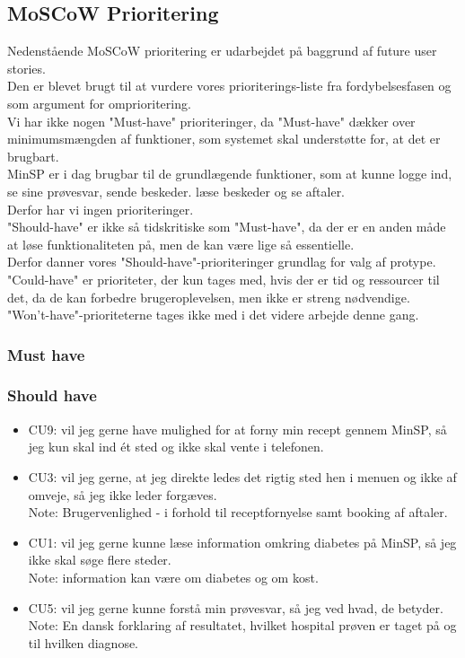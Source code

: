 \subsection{MoSCoW Prioritering}
Nedenstående MoSCoW prioritering er udarbejdet på baggrund af future user stories.\\
Den er blevet brugt til at vurdere vores prioriterings-liste fra fordybelsesfasen og som argument for omprioritering.\\
Vi har ikke nogen "Must-have" prioriteringer, da "Must-have" dækker over minimumsmængden af funktioner, som systemet skal understøtte for, at det er brugbart.\\
MinSP er i dag brugbar til de grundlægende funktioner, som at kunne logge ind, se sine prøvesvar, sende beskeder. læse beskeder og se aftaler. \\
Derfor har vi ingen prioriteringer.\\
"Should-have" er ikke så tidskritiske som "Must-have", da der er en anden måde at løse funktionaliteten på, men de kan være lige så essentielle.\\
Derfor danner vores "Should-have"-prioriteringer grundlag for valg af protype.\\
"Could-have" er prioriteter, der kun tages med, hvis der er tid og ressourcer til det, da de kan forbedre brugeroplevelsen, men ikke er streng nødvendige. \\
"Won't-have"-prioriteterne tages ikke med i det videre arbejde denne gang.
\subsubsection*{Must have}
\subsubsection*{Should have}
\begin{itemize}
\item CU9: vil jeg gerne have mulighed for at forny min recept gennem MinSP, så jeg kun skal ind ét sted og ikke skal vente i telefonen.
\item CU3: vil jeg gerne, at jeg direkte ledes det rigtig sted hen i menuen og ikke af omveje, så jeg ikke leder forgæves. \\
Note: Brugervenlighed - i forhold til receptfornyelse samt booking af aftaler.
\item CU1: vil jeg gerne kunne læse information omkring diabetes på MinSP, så jeg ikke skal søge flere steder. \\
Note: information kan være om diabetes og om kost.
\item CU5: vil jeg gerne kunne forstå min prøvesvar, så jeg ved hvad, de betyder. \\
Note: En dansk forklaring af resultatet, hvilket hospital prøven er taget på og til hvilken diagnose.
\end{itemize}
